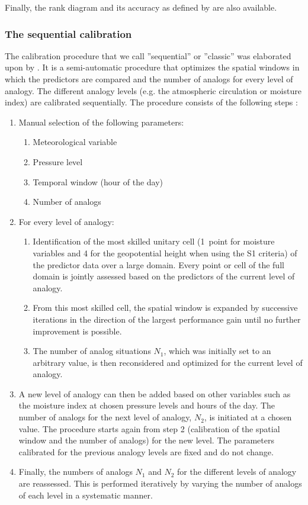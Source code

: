 \documentclass[gmdd]{copernicus}
\begin{document}
Finally, the rank diagram \citep{Talagrand1997} and its accuracy as defined by \citet{Candille2005} are also available.


\subsubsection{The sequential calibration}
\label{sec:sequential}

The calibration procedure that we call ''sequential'' or ''classic'' was elaborated upon by \citet{Bontron2004} \cite[see also][]{Radanovics2013, BenDaoud2016}. It is a semi-automatic procedure that optimizes the spatial windows in which the predictors are compared and the number of analogs for every level of analogy. The different analogy levels (e.g. the atmospheric circulation or moisture index) are calibrated sequentially. The procedure consists of the following steps \citep{Bontron2004}:

\begin{enumerate}
	\item Manual selection of the following parameters:
	\begin{enumerate}
		\item Meteorological variable
		\item Pressure level
		\item Temporal window (hour of the day)
		\item Number of analogs 
	\end{enumerate}
	
	\item For every level of analogy:
	\begin{enumerate}
		\item Identification of the most skilled unitary cell (1~point for moisture variables and 4 for the geopotential height when using the S1 criteria) of the predictor data over a large domain. Every point or cell of the full domain is jointly assessed based on the predictors of the current level of analogy.
		\item From this most skilled cell, the spatial window is expanded by successive iterations in the direction of the largest performance gain until no further improvement is possible.
		\item The number of analog situations $N_{1}$, which was initially set to an arbitrary value, is then reconsidered and optimized for the current level of analogy.
	\end{enumerate}
	\item A new level of analogy can then be added based on other variables such as the moisture index at chosen pressure levels and hours of the day. The number of analogs for the next level of analogy, $N_{2}$, is initiated at a chosen value. The procedure starts again from step 2 (calibration of the spatial window and the number of analogs) for the new level. The parameters calibrated for the previous analogy levels are fixed and do not change.
	\item Finally, the numbers of analogs $N_{1}$ and $N_{2}$ for the different levels of analogy are reassessed. This is performed iteratively by varying the number of analogs of each level in a systematic manner. 
\end{enumerate}
\end{document}
